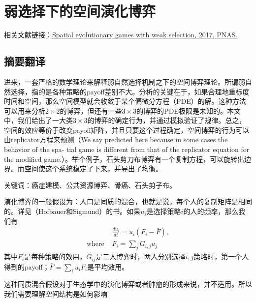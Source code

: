 \section{弱选择下的空间演化博弈}
相关文献链接：\href{https://www.pnas.org/content/114/23/6046}{Spatial evolutionary games with weak selection, 2017, PNAS.}

\subsection{摘要翻译}

进来，一套严格的数学理论来解释弱自然选择机制之下的空间博弈理论。所谓弱自然选择，指的是各种策略的payoff差别不大。分析的关键在于，如果合理地重标度时间和空间，那么空间模型就会收敛于某个偏微分方程（PDE）的解。这种方法可以用来分析$2\times 2$的博弈，但还有一些$3\times 3$的博弈的PDE极限是未知的。本文中，我们给出了一大类$3\times3$的博弈的确定行为，并通过模拟验证了规律。总之，空间的效应等价于改变payoff矩阵，并且只要这个过程确定，空间博弈的行为可以由replicator方程来预测（We say predicted here because in some cases the behavior of the spa- tial game is different from that of the replicator equation for the modified game.）。举个例子，石头剪刀布博弈有一个复制方程，可以旋转出边界。而空间使这个系统稳定了下来，并导出了均衡。

关键词：癌症建模、公共资源博弈、骨癌、石头剪子布。

演化博弈的一般假设为：人口是同质的混合，也就是说，每个人的复制矩阵是相同的。详见（Hofbauer和Sigmund）的书。如果$u_i$是选择策略$i$的人的频率，那么我们有\begin{align}
    & \frac{d u_i}{dt} = u_i(F_i-\bar{F}),\\
    \text{where } & F_i = \sum_{j} G_{i,j} u_j
\end{align}
其中$F_i$是每种策略的效用，$G_{ij}$是二人博弈时，两人分别选择$i,j$策略时，第一个人得到的payoff；$\bar{F}=\sum_i u_i F_i$是平均效用。

这种同质混合假设对于生态学中的演化博弈或者肿瘤的形成来说，并不适用。所以我们需要理解空间结构是如何影响
